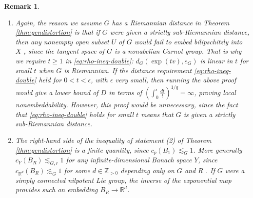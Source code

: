 \documentclass[11pt,reqno]{amsart}
\newtheorem{remark}[theorem]{Remark}
\newcommand{\1}{\mathbf 1}
\begin{document}
\begin{remark}\,
    \begin{enumerate}
        \item Again, the reason we assume $G$ has a Riemannian distance in Theorem \ref{thm:gendistortion} is that if $G$ were given a strictly sub-Riemannian distance, then any nonempty open subset $U$ of $G$ would fail to embed bilipschitzly into $X$ \cite{huang2020non}, since the tangent space of $G$ is a nonabelian Carnot group. That is why we require $t\ge 1$ in \eqref{eq:rho-ineq-double}: $d_G\left(\exp\left(tv\right),e_G\right)$ is linear in $t$ for small $t$ when $G$ is Riemannian. If the distance requirement \eqref{eq:rho-ineq-double} held for $0<t<\epsilon$, with $\epsilon$ very small, then running the above proof would give a lower bound of $D$ in terms of $\left(\int_0^\epsilon \frac{dt}t\right)^{1/q}=\infty$, proving local nonembeddability. However, this proof would be unnecessary, since the fact that \eqref{eq:rho-ineq-double} holds for small $t$ means that $G$ is given a strictly sub-Riemannian distance.
        \item The right-hand side of the inequality of statement (2) of Theorem \ref{thm:gendistortion} is a finite quantity, since $c_p\left(B_1\right)\lesssim_G 1$. More generally $c_Y\left(B_R\right)\lesssim_{G,r}1$ for any infinite-dimensional Banach space $Y$, since $c_{\mathbb{R}^d}\left(B_R\right)\lesssim_G 1$ for some $d\in \mathbb{Z}_{>0}$ depending only on $G$ and $R$ \cite{eriksson2018quantitative}. If $G$ were a simply connected nilpotent Lie group, the inverse of the exponential map provides such an embedding $B_R\to \mathbb{R}^d$. 
    \end{enumerate}
\end{remark}
\end{document}
